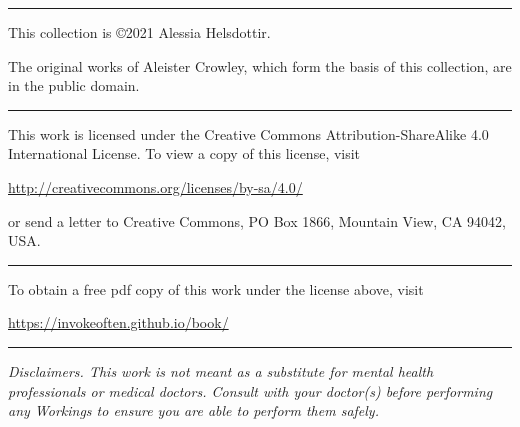 {
\vspace*{\fill}
\begin{center}
  \rule{1in}{0.5pt}
\end{center}

This collection is \copyright 2021 Alessia Helsdottir.

\vspace{\baselineskip}

The original works of Aleister Crowley, which form the basis of this collection, are in the public domain.

\begin{center}
  \rule{1in}{0.5pt}
\end{center}

\begin{center}
\end{center}

This work is licensed under the Creative Commons Attribution-ShareAlike 4.0 International License. To view a copy of this license, visit

\begin{center} \url{http://creativecommons.org/licenses/by-sa/4.0/} \end{center}

or send a letter to Creative Commons, PO Box 1866, Mountain View, CA 94042, USA.

\begin{center}
  \rule{1in}{0.5pt}
\end{center}

To obtain a free pdf copy of this work under the license above, visit

\begin{center}\url{https://invokeoften.github.io/book/}\end{center}

\begin{center}
  \rule{1in}{0.5pt}
\end{center}


\textit{Disclaimers. This work is not meant as a substitute for mental health professionals or medical doctors. Consult with your doctor(s) before performing any Workings to ensure you are able to perform them safely.}

}
